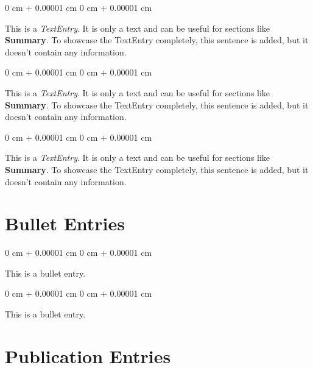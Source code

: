 \documentclass[10pt, letterpaper]{article}
\newenvironment{onecolentry}{
    \begin{adjustwidth}{
        0 cm + 0.00001 cm
    }{
        0 cm + 0.00001 cm
    }
}{
    \end{adjustwidth}
} %
\begin{document}
        
        \begin{onecolentry}
            This is a \textit{TextEntry}. It is only a text and can be useful for sections like \textbf{Summary}. To showcase the TextEntry completely, this sentence is added, but it doesn't contain any information.
        \end{onecolentry}

        \vspace{0.1 cm}

        \begin{onecolentry}
            This is a \textit{TextEntry}. It is only a text and can be useful for sections like \textbf{Summary}. To showcase the TextEntry completely, this sentence is added, but it doesn't contain any information.
        \end{onecolentry}

        \vspace{0.1 cm}

        \begin{onecolentry}
            This is a \textit{TextEntry}. It is only a text and can be useful for sections like \textbf{Summary}. To showcase the TextEntry completely, this sentence is added, but it doesn't contain any information.
        \end{onecolentry}


    
    \section{Bullet Entries}

        
        \begin{onecolentry}
            \textbullet \hspace{3pt} This is a bullet entry.
        \end{onecolentry}

        \vspace{0.1 cm}

        \begin{onecolentry}
            \textbullet \hspace{3pt} This is a bullet entry.
        \end{onecolentry}


    
    \section{Publication Entries}
\end{document}
